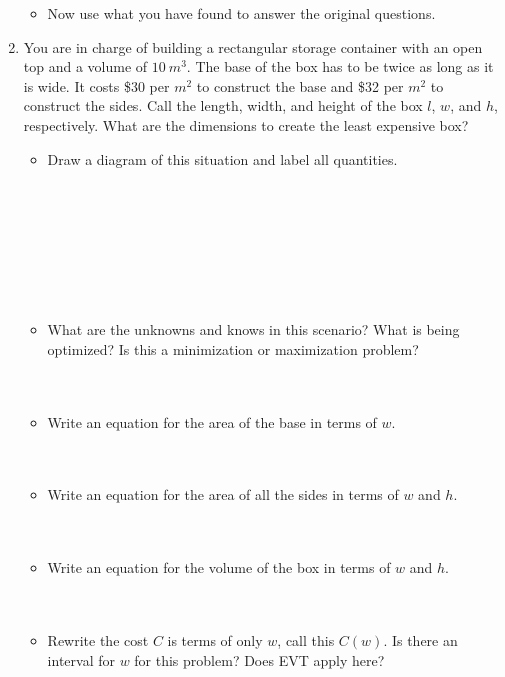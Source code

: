 \documentclass[12pt]{article}
\begin{document}
\begin{enumerate}
\begin{itemize}
        \item Now use what you have found to answer the original questions.
    \end{itemize}
    \newpage
    \item You are in charge of building a rectangular storage container with an open top and a volume of $10\ m^{3}$. The base of the box has to be twice as long as it is wide. It costs \$30 per $m^{2}$ to construct the base and \$32 per $m^{2}$ to construct the sides. Call the length, width, and height of the box $l$, $w$, and $h$, respectively. What are the dimensions to create the least expensive box?
    \begin{itemize}
        \item Draw a diagram of this situation and label all quantities.\\\\\\\\\\\\\\\\
        \item What are the unknowns and knows in this scenario? What is being optimized? Is this a minimization or maximization problem?\\\\\\


        \item Write an equation for the area of the base in terms of $w$.\\\\\\
        
        \item Write an equation for the area of all the sides in terms of $w$ and $h$.\\\\\\

        \item Write an equation for the volume of the box in terms of $w$ and $h$.\\\\\\

        \item Rewrite the cost $C$ is terms of only $w$, call this $C(w)$. Is there an interval for $w$ for this problem? Does EVT apply here?\\\\\\\\


\end{itemize}
\end{enumerate}
\end{document}
